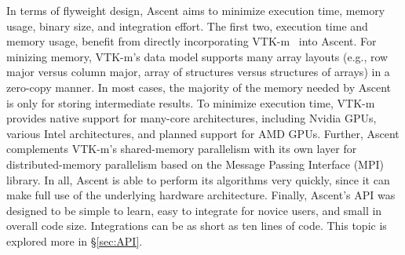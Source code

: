 In terms of flyweight design, Ascent aims to minimize 
execution time, memory usage, binary size, and integration effort.
%
The first two, execution time and memory usage, benefit from directly
incorporating VTK-m~\cite{Moreland:CGA2016} into Ascent.  
%
For minizing memory,
VTK-m's data model supports many array layouts (e.g., row major versus 
column major, array of structures versus structures of arrays) 
in a zero-copy manner.
%
In most cases, the majority of the memory needed by Ascent is only for
storing intermediate results.
%
To minimize execution time, 
VTK-m provides native support for many-core architectures,
including Nvidia GPUs, various Intel architectures, 
and planned support for AMD GPUs.
%
Further, Ascent complements VTK-m's shared-memory parallelism with
its own layer for distributed-memory parallelism based on the
Message Passing Interface (MPI) library.
%
In all, Ascent is able to perform its algorithms very quickly,
since it can make full use of the underlying hardware architecture.
%
%
Finally, Ascent's API was designed to be simple to learn,
easy to integrate for novice users, and small in overall code size.
%
Integrations can be as short as ten lines of code.
%
This topic is explored more in \S\ref{sec:API}.

